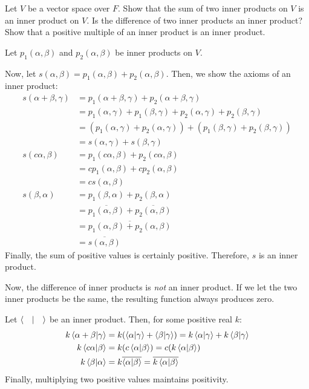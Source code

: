 \documentclass{agony}
\begin{document}
\begin{xca}
  Let $V$ be a vector space over $F$.
  Show that the sum of two inner products on $V$ is an inner product on $V$.
  Is the difference of two inner products an inner product?
  Show that a positive multiple of an inner product is an inner product.
\end{xca}
\begin{prf}
  Let $p_1(\alpha,\beta)$ and $p_2(\alpha,\beta)$ be inner products on $V$.

  Now, let $s(\alpha,\beta) = p_1(\alpha, \beta) + p_2(\alpha, \beta)$.
  Then, we show the axioms of an inner product:
  \begin{align*}
    s(\alpha+\beta,\gamma)
     & = p_1(\alpha+\beta,\gamma)+p_2(\alpha+\beta,\gamma)                                   \\
     & = p_1(\alpha,\gamma) + p_1(\beta,\gamma) + p_2(\alpha,\gamma) + p_2(\beta,\gamma)     \\
     & = (p_1(\alpha,\gamma) + p_2(\alpha,\gamma)) + (p_1(\beta,\gamma) + p_2(\beta,\gamma)) \\
     & = s(\alpha,\gamma) + s(\beta,\gamma)                                                  \\
    s(c\alpha, \beta)
     & = p_1(c\alpha, \beta) + p_2(c\alpha, \beta)                                           \\
     & = cp_1(\alpha,\beta) + cp_2(\alpha,\beta)                                             \\
     & = cs(\alpha,\beta)                                                                    \\
    s(\beta,\alpha)
     & = p_1(\beta,\alpha) + p_2(\beta,\alpha)                                               \\
     & = \overline{p_1(\alpha,\beta)} + \overline{p_2(\alpha,\beta)}                         \\
     & = \overline{p_1(\alpha,\beta) + p_2(\alpha,\beta)}                                    \\
     & = \overline{s(\alpha,\beta)}
  \end{align*}
  Finally, the sum of positive values is certainly positive.
  Therefore, $s$ is an inner product.

  Now, the difference of inner products is \emph{not} an inner product.
  If we let the two inner products be the same, the resulting function always produces zero.

  Let $\ip{\quad}$ be an inner product.
  Then, for some positive real $k$:
  \begin{align*}
    k\ip{\alpha+\beta}{\gamma} & = k(\ip{\alpha}{\gamma}+\ip{\beta}{\gamma}) = k\ip{\alpha}{\gamma} + k\ip{\beta}{\gamma} \\
    k\ip{c\alpha}{\beta}       & = k(c\ip{\alpha}{\beta}) = c(k\ip{\alpha}{\beta})                                        \\
    k\ip{\beta}{\alpha}        & = k\overline{\ip{\alpha}{\beta}} = \overline{k\ip{\alpha}{\beta}}
  \end{align*}
  Finally, multiplying two positive values maintains positivity.
\end{prf}
\end{document}
